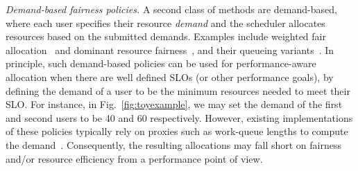 \emph{Demand-based fairness policies.}
A second class of methods are demand-based, where each user specifies their resource
\emph{demand} and the scheduler allocates resources based on the submitted demands.
Examples include weighted fair allocation~\citep{demers1989analysis} and dominant resource
fairness~\citep{ghodsi2011dominant}, and their queueing
variants~\citep{waldspurger1994lottery,stiliadis1998latency,ghodsi2012multi}.
In principle, such demand-based policies can be used for performance-aware allocation when there are
well defined SLOs (or other performance goals), by defining the demand of a user to be the
minimum resources needed to meet their SLO.
For instance, in  Fig.~\ref{fig:toyexample}, we may set the demand of the first and
second users to be 40 and 60 respectively.
However, existing implementations of these policies typically rely on
proxies such as work-queue lengths
to compute the demand~\citep{bennett1996wf,hindman2011mesos,ghodsi2013choosy}.
Consequently, the resulting allocations may fall short on fairness and/or resource efficiency from
a performance point of view.



